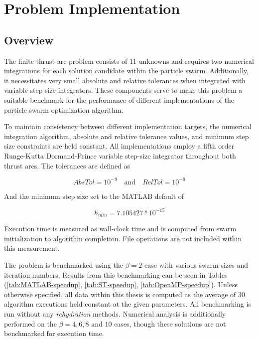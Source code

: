 \chapter{Problem Implementation}
\section{Overview}
\noindent The finite thrust arc problem consists of 11 unknowns and requires two numerical integrations for each solution candidate within the
particle swarm. Additionally, it necessitates very small absolute and relative tolerances when integrated with variable step-size integrators. These
components serve to make this problem a suitable benchmark for the performance of different implementations of the particle swarm optimization algorithm. \newline

\noindent To maintain consistency between different implementation targets, the numerical integration algorithm, absolute and relative tolerance values,
and minimum step size constraints are held constant. All implementations employ a fifth order Runge-Kutta Dormand-Prince variable step-size integrator
throughout both thrust arcs. The tolerances are defined as

\begin{equation}
AbsTol = 10^{-9} \quad \text{and} \quad RelTol = 10^{-9} 
\label{eq:tolerances}
\end{equation}

\noindent And the minimum step size set to the MATLAB default of

\begin{equation}
    h_{min} = 7.105427*10^{-15}
    \label{eq:min-step-size}
\end{equation}

\noindent Execution time is measured as wall-clock time and is computed from swarm initialization 
to algorithm completion. File operations are not included within this measurement. \newline

\noindent The problem is benchmarked using the $\beta = 2$ case with various swarm sizes and iteration numbers. 
Results from this benchmarking can be seen in Tables (\ref{tab:MATLAB-speedup}, \ref{tab:ST-speedup}, \ref{tab:OpenMP-speedup}). Unless otherwise 
specified, all data within this thesis is computed as the average of 30 algorithm executions held constant at the given parameters. 
All benchmarking is run without any \textit{rehydration} methods.
Numerical analysis is additionally performed on the $\beta=4,6,8 \text{ and } 10$ cases, though these solutions are not benchmarked for execution time.

